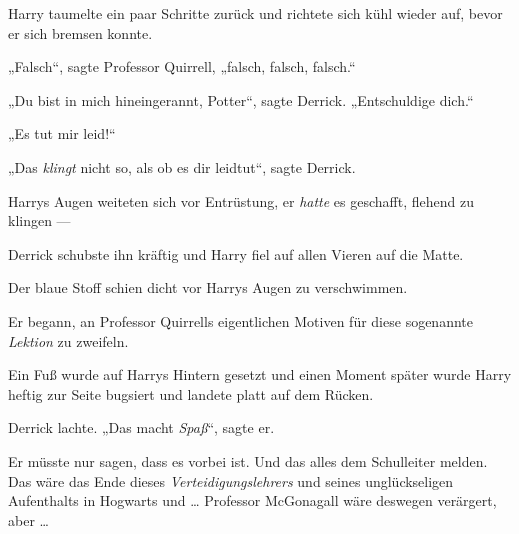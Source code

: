 Harry taumelte ein paar Schritte zurück und richtete sich kühl wieder auf, bevor er sich bremsen konnte.

„Falsch“, sagte Professor Quirrell, „falsch, falsch, falsch.“

„Du bist in mich hineingerannt, Potter“, sagte Derrick.
„Entschuldige dich.“

„Es tut mir leid!“

„Das \emph{klingt} nicht so, als ob es dir leidtut“, sagte Derrick.

Harrys Augen weiteten sich vor Entrüstung, er \emph{hatte} es geschafft, flehend zu klingen —

Derrick schubste ihn kräftig und Harry fiel auf allen Vieren auf die Matte.

Der blaue Stoff schien dicht vor Harrys Augen zu verschwimmen.

Er begann, an Professor Quirrells eigentlichen Motiven für diese sogenannte \emph{Lektion} zu zweifeln.

Ein Fuß wurde auf Harrys Hintern gesetzt und einen Moment später wurde Harry heftig zur Seite bugsiert und landete platt auf dem Rücken.

Derrick lachte.
„Das macht \emph{Spaß}“, sagte er.

Er müsste nur sagen, dass es vorbei ist. Und das alles dem Schulleiter melden. Das wäre das Ende dieses \emph{Verteidigungslehrers} und seines unglückseligen Aufenthalts in Hogwarts und … Professor McGonagall wäre deswegen verärgert, aber …

